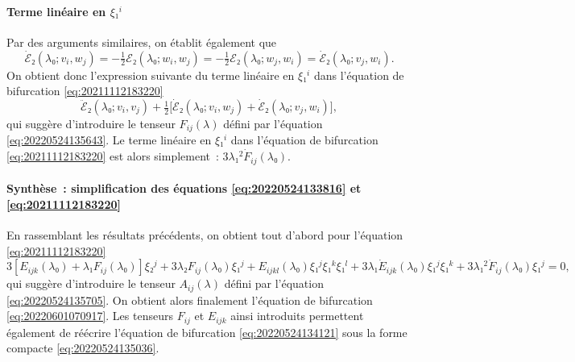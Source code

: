 \documentclass[12pt, final]{amsart}
\theoremstyle{definition}
\begin{document}
\paragraph{Terme linéaire en \(ξ₁^i\)} Par des arguments similaires, on établit
également que
\begin{equation}
  \dot{ℰ}₂(λ₀; v_i, w_j) = - \tfrac{1}{2} ℰ₂(λ₀; w_i, w_j) = - \tfrac{1}{2} ℰ₂(λ₀; w_j, w_i) = \dot{ℰ}₂(λ₀; v_j, w_i).
\end{equation}
On obtient donc l'expression suivante du terme linéaire en \(ξ₁^i\) dans
l'équation de bifurcation \eqref{eq:20211112183220}
\begin{equation}
  \ddot{ℰ}₂(λ₀; v_i, v_j) + \tfrac{1}{2}\bigl[\dot{ℰ}₂(λ₀; v_i, w_j) + \dot{ℰ}₂(λ₀; v_j, w_i)\bigr],
\end{equation}
qui suggère d'introduire le tenseur \(F_{i j}(λ)\) défini par l'équation
\eqref{eq:20220524135643}. Le terme linéaire en \(ξ₁^i\) dans l'équation de
bifurcation \eqref{eq:20211112183220} est alors simplement~:
\(3 λ₁^2 \dot{F}_{i j}(λ₀)\).

\paragraph{Synthèse~: simplification des équations \eqref{eq:20220524133816} et
  \eqref{eq:20211112183220}} En rassemblant les résultats précédents, on obtient
tout d'abord pour l'équation \eqref{eq:20211112183220}
\begin{equation}
  3 [E_{i j k}(λ₀) + λ₁ F_{i j} (λ₀)] ξ₂^j + 3 λ₂ F_{i j}(λ₀) ξ₁^j + E_{i j k l}(λ₀) ξ₁^j ξ₁^k ξ₁^l + 3 λ₁ \dot{E}_{i j k} (λ₀) ξ₁^j ξ₁^k + 3 λ₁^2 \dot{F}_{i j}(λ₀) ξ₁^j = 0,
\end{equation}
qui suggère d'introduire le tenseur \(A_{i j}(λ)\) défini par l'équation
\eqref{eq:20220524135705}. On obtient alors finalement l'équation de bifurcation
\eqref{eq:20220601070917}. Les tenseurs \(F_{i j}\) et \(E_{i j k}\) ainsi
introduits permettent également de réécrire l'équation de bifurcation
\eqref{eq:20220524134121} sous la forme compacte \eqref{eq:20220524135036}.
\end{document}
